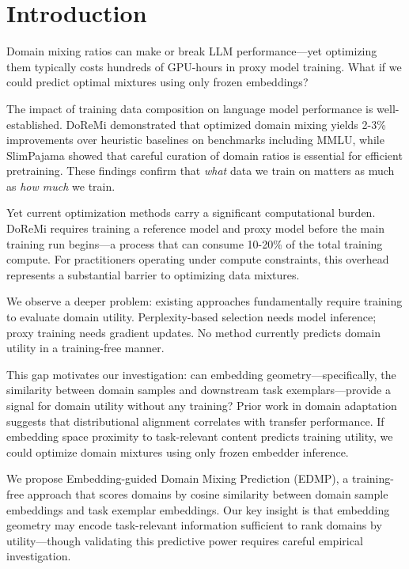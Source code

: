 \section{Introduction}

Domain mixing ratios can make or break LLM performance---yet optimizing them typically costs hundreds of GPU-hours in proxy model training. What if we could predict optimal mixtures using only frozen embeddings?

The impact of training data composition on language model performance is well-established. DoReMi \citep{xie2023doremi} demonstrated that optimized domain mixing yields 2-3\% improvements over heuristic baselines on benchmarks including MMLU, while SlimPajama \citep{soboleva2023slimpajama} showed that careful curation of domain ratios is essential for efficient pretraining. These findings confirm that \emph{what} data we train on matters as much as \emph{how much} we train.

Yet current optimization methods carry a significant computational burden. DoReMi requires training a reference model and proxy model before the main training run begins---a process that can consume 10-20\% of the total training compute. For practitioners operating under compute constraints, this overhead represents a substantial barrier to optimizing data mixtures.

We observe a deeper problem: existing approaches fundamentally require training to evaluate domain utility. Perplexity-based selection needs model inference; proxy training needs gradient updates. No method currently predicts domain utility in a training-free manner.

This gap motivates our investigation: can embedding geometry---specifically, the similarity between domain samples and downstream task exemplars---provide a signal for domain utility without any training? Prior work in domain adaptation \citep{xie2023dsir} suggests that distributional alignment correlates with transfer performance. If embedding space proximity to task-relevant content predicts training utility, we could optimize domain mixtures using only frozen embedder inference.

We propose Embedding-guided Domain Mixing Prediction (EDMP), a training-free approach that scores domains by cosine similarity between domain sample embeddings and task exemplar embeddings. Our key insight is that embedding geometry may encode task-relevant information sufficient to rank domains by utility---though validating this predictive power requires careful empirical investigation.

